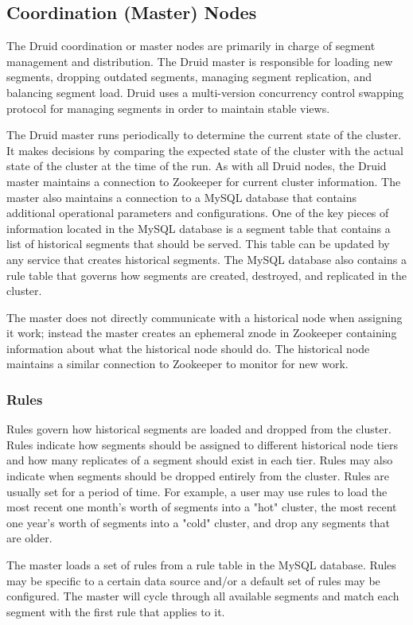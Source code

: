 \documentclass{vldb}
\begin{document}
\subsection{Coordination (Master) Nodes}
The Druid coordination or master nodes are primarily in charge of
segment management and distribution. The Druid master is responsible
for loading new segments, dropping outdated segments, managing segment
replication, and balancing segment load. Druid uses a multi-version
concurrency control swapping protocol for managing segments in order
to maintain stable views.

The Druid master runs periodically to determine the current state of
the cluster. It makes decisions by comparing the expected state of the
cluster with the actual state of the cluster at the time of the
run. As with all Druid nodes, the Druid master maintains a connection
to Zookeeper for current cluster information. The master also
maintains a connection to a MySQL database that contains additional
operational parameters and configurations. One of the key pieces of
information located in the MySQL database is a segment table that
contains a list of historical segments that should be served. This
table can be updated by any service that creates historical
segments. The MySQL database also contains a rule table that governs
how segments are created, destroyed, and replicated in the cluster.

The master does not directly communicate with a historical node when
assigning it work; instead the master creates an ephemeral znode in
Zookeeper containing information about what the historical node should
do. The historical node maintains a similar connection to Zookeeper to
monitor for new work.

\subsubsection{Rules}
Rules govern how historical segments are loaded and dropped from the cluster. 
Rules indicate how segments should be assigned to
different historical node tiers and how many replicates of a segment
should exist in each tier. Rules may also indicate when segments
should be dropped entirely from the cluster. Rules are usually set for a period of time. 
For example, a user may use rules to load the most recent one month's worth of segments into a "hot" cluster, 
the most recent one year's worth of segments into a "cold" cluster, and drop any segments that are older.

The master loads a set of
rules from a rule table in the MySQL database. Rules may be specific
to a certain data source and/or a default set of rules may be
configured. The master will cycle through all available segments and
match each segment with the first rule that applies to it.
\end{document}
